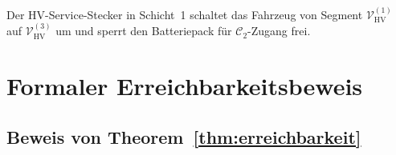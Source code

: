 ﻿\documentclass[12pt,a4paper]{article}
\begin{document}
Der HV-Service-Stecker in Schicht~1 schaltet das Fahrzeug von Segment
$\mathcal{V}_\mathrm{HV}^{(1)}$ auf $\mathcal{V}_\mathrm{HV}^{(3)}$ um und
sperrt den Batteriepack für $\mathcal{C}_2$-Zugang frei.

\section{Formaler Erreichbarkeitsbeweis}
\label{sec:beweis}

\subsection{Beweis von Theorem~\ref{thm:erreichbarkeit}}
\end{document}
